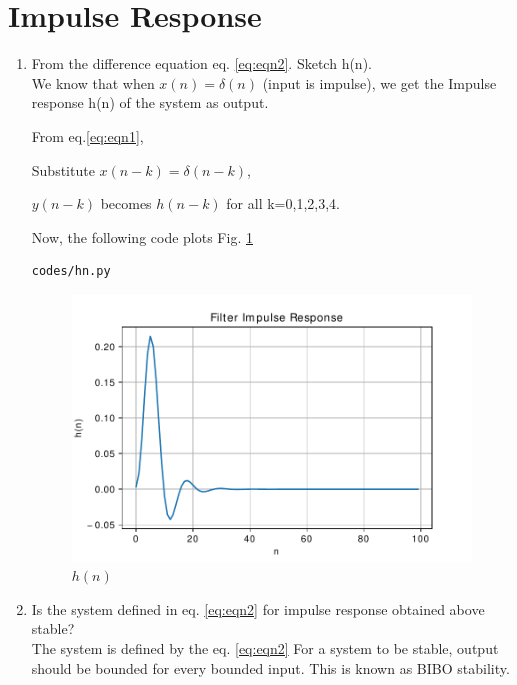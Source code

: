 \documentclass[journal,12pt,twocolumn]{IEEEtran}
\renewcommand\thesection{\arabic{section}}
\begin{document}
\section{Impulse Response}
\begin{enumerate}[label=\thesection.\arabic*,ref=\thesection.\theenumi]
\item
From the difference equation eq. \ref{eq:eqn2}. Sketch h(n). 
\label{prob:hn}
\\
\solution
We know that when $x(n) = \delta(n)$ (input is impulse),  we get the Impulse response h(n) of the system as output.

From eq.\ref{eq:eqn1}, 

Substitute $x(n-k) = \delta(n-k)$, 

$y(n-k)$ becomes $h(n-k)$ for all k=0,1,2,3,4.

Now, the following code plots Fig. \ref{fig:hn}
\begin{lstlisting}
codes/hn.py
\end{lstlisting}
\begin{figure}[!ht]
\centering
\includegraphics[width=\columnwidth]{./figs/hn}
\caption{$h(n)$}
\label{fig:hn}
\end{figure}

\item Is the system defined in eq. \ref{eq:eqn2} for impulse response obtained above stable?
\\
\solution
The system is defined by the eq. \ref{eq:eqn2}
For a system to be stable, output should be bounded for every bounded input. This is known as BIBO stability.


\end{enumerate}
\end{document}
